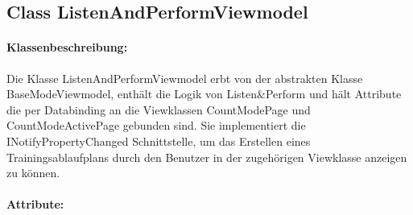 \documentclass[a4paper,12pt]{article}
\begin{document}
\subsection{Class ListenAndPerformViewmodel}
\paragraph{Klassenbeschreibung:}
Die Klasse ListenAndPerformViewmodel erbt von der abstrakten Klasse BaseModeViewmodel, enthält die Logik von Listen\&Perform und hält Attribute die per Databinding an die Viewklassen CountModePage und CountModeActivePage gebunden sind.  Sie implementiert die INotifyPropertyChanged Schnittstelle, um das Erstellen eines Trainingsablaufplans durch den Benutzer in der zugehörigen Viewklasse anzeigen zu können.
\paragraph{Attribute:}
\end{document}

